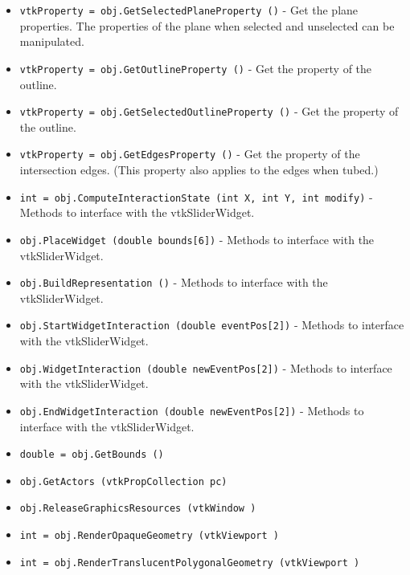 \begin{itemize}
\item  \verb|vtkProperty = obj.GetSelectedPlaneProperty ()| -  Get the plane properties. The properties of the plane when selected 
 and unselected can be manipulated.

\item  \verb|vtkProperty = obj.GetOutlineProperty ()| -  Get the property of the outline.

\item  \verb|vtkProperty = obj.GetSelectedOutlineProperty ()| -  Get the property of the outline.

\item  \verb|vtkProperty = obj.GetEdgesProperty ()| -  Get the property of the intersection edges. (This property also
 applies to the edges when tubed.)

\item  \verb|int = obj.ComputeInteractionState (int X, int Y, int modify)| -  Methods to interface with the vtkSliderWidget.

\item  \verb|obj.PlaceWidget (double bounds[6])| -  Methods to interface with the vtkSliderWidget.

\item  \verb|obj.BuildRepresentation ()| -  Methods to interface with the vtkSliderWidget.

\item  \verb|obj.StartWidgetInteraction (double eventPos[2])| -  Methods to interface with the vtkSliderWidget.

\item  \verb|obj.WidgetInteraction (double newEventPos[2])| -  Methods to interface with the vtkSliderWidget.

\item  \verb|obj.EndWidgetInteraction (double newEventPos[2])| -  Methods to interface with the vtkSliderWidget.

\item  \verb|double = obj.GetBounds ()|

\item  \verb|obj.GetActors (vtkPropCollection pc)|

\item  \verb|obj.ReleaseGraphicsResources (vtkWindow )|

\item  \verb|int = obj.RenderOpaqueGeometry (vtkViewport )|

\item  \verb|int = obj.RenderTranslucentPolygonalGeometry (vtkViewport )|


\end{itemize}
